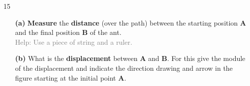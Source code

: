 \documentclass[A4,12pt]{article}
\begin{document}
\begin{enumerate}[label=\bfseries (\arabic*)]
\begin{center}
\begin{animateinline}[autoplay,loop,
    begin={\begin{tikzpicture}[scale=1.0]},
    end={\stepcounter{cnt}\end{tikzpicture}}
    ]{15}
    \newframe
    \newframe
    \newframe
    \newframe
    \newframe
    \newframe
    \newframe
    \newframe
    \newframe
    \newframe
    \newframe
    \newframe
    \newframe
    \newframe
  \end{animateinline}
  \end{center}
%
\begin{itemize}
    \item[\bf (a)] \textbf{Measure} the \textbf{distance} (over the path) between the starting position \textbf{A} and the final position \textbf{B} of the ant.\\
    \textcolor{gray}{Help: Use a piece of string and a ruler.}
    \item[\bf (b)] What is the \textbf{displacement} between \textbf{A} and \textbf{B}. For this give the module of the displacement and indicate the direction drawing and arrow in the figure starting at the initial point \textbf{A}.
\end{itemize}






















\end{enumerate}
\end{document}
